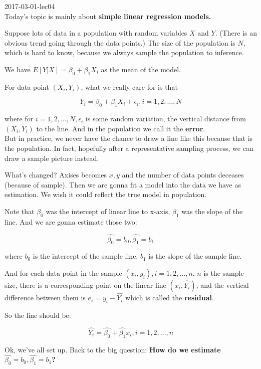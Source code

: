 \documentclass[a4paper, 11pt, twoside]{article}
\begin{document}
2017-03-01-lec04\\

Today's topic is mainly about \textbf{simple linear regression models.}

Suppose lots of data in a population with random variables $X$ and $Y$. (There is an obvious trend going through the data points.) The size of the population is $N$, which is hard to know, because we always sample the population to inference.

We have $E[Y|X] = \beta_0 + \beta_1 X_i$ as the mean of the model.

For data point $(X_i, Y_i)$, what we really care for is that 

\[ Y_i = \beta_0 + \beta_1 X_i + \epsilon_i, i=1, 2,\dots, N\] 

where for $i= 1, 2, \dots, N,\epsilon_i $ is some random variation, the vertical distance from $(X_i, Y_i)$ to the line. And in the population we call it the \textbf{error}. \\

But in practice, we never have the chance to draw a line like this because that is the population. In fact, hopefully after a representative sampling process, we can draw a sample picture instead.

What's changed? Axises becomes $x, y$ and the number of data points deceases (because of sample). Then we are gonna fit a model into the data we have as estimation. We wish it could reflect the true model in population.

Note that $\beta_0$ was the intercept of linear line to x-axis, $\beta_1$ was the slope of the line. And we are gonna estimate those two:

\[ \hat{\beta_0} = b_0, \hat{\beta_1} = b_1 \]

where $b_0$ is the intercept of the sample line, $b_1$ is the slope of the sample line.

And for each data point in the sample $(x_i, y_i), i = 1, 2, \dots, n$, $n$ is the sample size, there is a corresponding point on the linear line $(x_i, \hat{Y_i})$, and the vertical difference between them is $e_i = y_i - \hat{Y_i}$ which is called the \textbf{residual}.

So the line should be:

\[ \hat{Y_i} = \hat{\beta_0} + \hat{\beta_1}x_i, i=1,2,\dots, n\]

Ok, we've all set up. Back to the big question: \textbf{How do we estimate $\hat{\beta_0}=b_0, \hat{\beta_1}=b_1$?}
\end{document}
